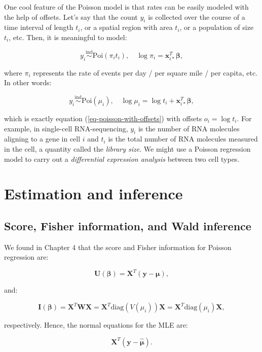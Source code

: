 \documentclass[
  11pt,
  letterpaper,
  oneside]{book}
\theoremstyle{plain}
\theoremstyle{plain}
\theoremstyle{definition}
\theoremstyle{definition}
\theoremstyle{plain}
\theoremstyle{remark}
\begin{document}
One cool feature of the Poisson model is that rates can be easily
modeled with the help of offsets. Let's say that the count \(y_i\) is
collected over the course of a time interval of length \(t_i\), or a
spatial region with area \(t_i\), or a population of size \(t_i\), etc.
Then, it is meaningful to model:

\[
y_i \overset{\text{ind}} \sim \text{Poi}(\pi_i t_i), \quad \log \pi_i = \boldsymbol{x}^T_{i*}\boldsymbol{\beta},
\]

where \(\pi_i\) represents the rate of events per day / per square mile
/ per capita, etc. In other words:

\[
y_i \overset{\text{ind}} \sim \text{Poi}(\mu_i), \quad \log \mu_i = \log t_i + \boldsymbol{x}^T_{i*}\boldsymbol{\beta},
\]

which is exactly equation (\ref{eq-poisson-with-offsets}) with offsets
\(o_i = \log t_i\). For example, in single-cell RNA-sequencing, \(y_i\)
is the number of RNA molecules aligning to a gene in cell \(i\) and
\(t_i\) is the total number of RNA molecules measured in the cell, a
quantity called the \emph{library size}. We might use a Poisson
regression model to carry out a \emph{differential expression analysis}
between two cell types.

\hypertarget{sec-estimation-inference}{%
\section{Estimation and inference}\label{sec-estimation-inference}}

\hypertarget{sec-wald-inference}{%
\subsection{Score, Fisher information, and Wald
inference}\label{sec-wald-inference}}

We found in Chapter 4 that the score and Fisher information for Poisson
regression are:

\[
\boldsymbol{U}(\boldsymbol{ \beta}) = \boldsymbol{X}^T(\boldsymbol{y} - \boldsymbol{\mu}),
\]

and:

\[
\boldsymbol{I}(\boldsymbol{\beta}) = \boldsymbol{X}^T \boldsymbol{W} \boldsymbol{X} = \boldsymbol{X}^T \text{diag}(V(\mu_i))\boldsymbol{X} = \boldsymbol{X}^T \text{diag}(\mu_i)\boldsymbol{X},
\]

respectively. Hence, the normal equations for the MLE are:

\[
\boldsymbol{X}^T(\boldsymbol{y} - \boldsymbol{\hat \mu}).
\]
\end{document}
